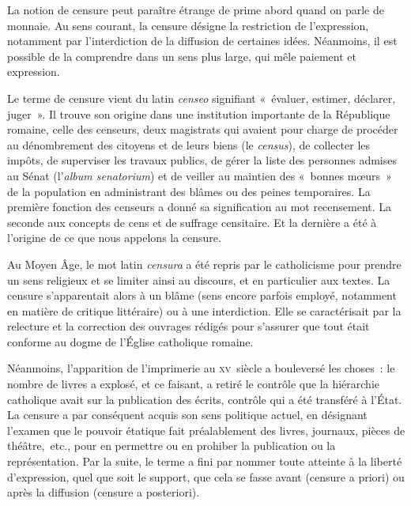 La notion de censure peut paraître étrange de prime abord quand on parle de monnaie. Au sens courant, la censure désigne la restriction de l'expression, notamment par l'interdiction de la diffusion de certaines idées. Néanmoins, il est possible de la comprendre dans un sens plus large, qui mêle paiement et expression.

Le terme de censure vient du latin \emph{censeo} signifiant «~évaluer, estimer, déclarer, juger~». Il trouve son origine dans une institution importante de la République romaine, celle des censeurs, deux magistrats qui avaient pour charge de procéder au dénombrement des citoyens et de leurs biens (le \emph{census}), de collecter les impôts, de superviser les travaux publics, de gérer la liste des personnes admises au Sénat (l'\emph{album senatorium}) et de veiller au maintien des «~bonnes mœurs~» de la population en administrant des blâmes ou des peines temporaires. La première fonction des censeurs a donné sa signification au mot recensement. La seconde aux concepts de cens et de suffrage censitaire. Et la dernière a été à l'origine de ce que nous appelons la censure.

Au Moyen Âge, le mot latin \emph{censura} a été repris par le catholicisme pour prendre un sens religieux et se limiter ainsi au discours, et en particulier aux textes. La censure s'apparentait alors à un blâme (sens encore parfois employé, notamment en matière de critique littéraire) ou à une interdiction. Elle se caractérisait par la relecture et la correction des ouvrages rédigés pour s'assurer que tout était conforme au dogme de l'Église catholique romaine.

Néanmoins, l'apparition de l'imprimerie au \textsc{xv}\ieme{}~siècle a bouleversé les choses~: le nombre de livres a explosé, et ce faisant, a retiré le contrôle que la hiérarchie catholique avait sur la publication des écrits, contrôle qui a été transféré à l'État. La censure a par conséquent acquis son sens politique actuel, en désignant l'examen que le pouvoir étatique fait préalablement des livres, journaux, pièces de théâtre,~etc., pour en permettre ou en prohiber la publication ou la représentation. Par la suite, le terme a fini par nommer toute atteinte à la liberté d'expression, quel que soit le support, que cela se fasse avant (censure a priori) ou après la diffusion (censure a posteriori).

